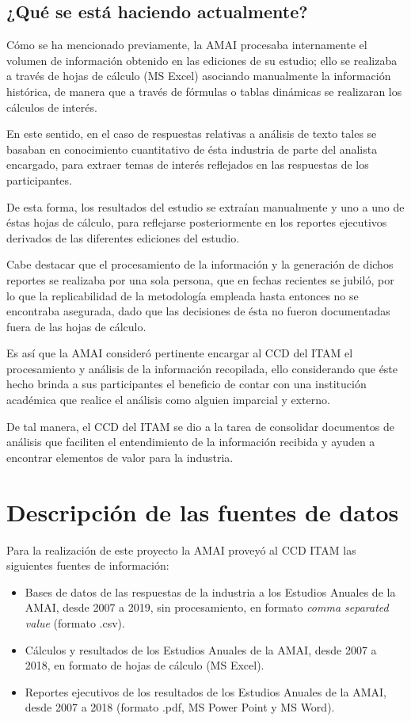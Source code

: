 \subsection{¿Qué se está haciendo actualmente?}

Cómo se ha mencionado previamente, la AMAI procesaba internamente el volumen de información obtenido en las ediciones de su estudio; ello se realizaba a través de hojas de cálculo (MS Excel) asociando manualmente la información histórica, de manera que a través de fórmulas o tablas dinámicas se realizaran los cálculos de interés.

En este sentido, en el caso de respuestas relativas a análisis de texto tales se basaban en conocimiento cuantitativo de ésta industria de parte del analista encargado, para extraer temas de interés reflejados en las respuestas de los participantes.

De esta forma, los resultados del estudio se extraían manualmente y uno a uno de éstas hojas de cálculo, para reflejarse posteriormente en los reportes ejecutivos derivados de las diferentes ediciones del estudio.

Cabe destacar que el procesamiento de la información y la generación de dichos reportes se realizaba por una sola persona, que en fechas recientes se jubiló, por lo que la replicabilidad de la metodología empleada hasta entonces no se encontraba asegurada, dado que las decisiones de ésta no fueron documentadas fuera de las hojas de cálculo.

Es así que la AMAI consideró pertinente encargar al CCD del ITAM el procesamiento y análisis de la información recopilada, ello considerando que éste hecho brinda a sus participantes el beneficio de contar con una institución académica que realice el análisis como alguien imparcial y externo.

De tal manera, el CCD del ITAM se dio a la tarea de consolidar documentos de análisis que faciliten el entendimiento de la información recibida y ayuden a encontrar elementos de valor para la industria.

\section{Descripción de las fuentes de datos} \label{data:sources}

Para la realización de este proyecto la AMAI proveyó al CCD ITAM las siguientes fuentes de información:

\begin{itemize}
    \item Bases de datos de las respuestas de la industria a los Estudios Anuales de la AMAI, desde 2007 a 2019, sin procesamiento, en formato \textit{comma separated value} (formato .csv).
    \item Cálculos y resultados de los Estudios Anuales de la AMAI, desde 2007 a 2018, en formato de hojas de cálculo (MS Excel).
    \item Reportes ejecutivos de los resultados de los Estudios Anuales de la AMAI, desde 2007 a 2018 (formato .pdf, MS Power Point y MS Word).
\end{itemize}

